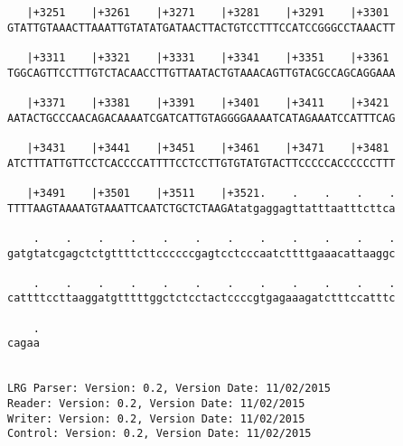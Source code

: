 \documentclass{article}
\begin{document}
\begin{Verbatim}
   |+3251    |+3261    |+3271    |+3281    |+3291    |+3301 
GTATTGTAAACTTAAATTGTATATGATAACTTACTGTCCTTTCCATCCGGGCCTAAACTT
                                                            
   |+3311    |+3321    |+3331    |+3341    |+3351    |+3361 
TGGCAGTTCCTTTGTCTACAACCTTGTTAATACTGTAAACAGTTGTACGCCAGCAGGAAA
                                                            
   |+3371    |+3381    |+3391    |+3401    |+3411    |+3421 
AATACTGCCCAACAGACAAAATCGATCATTGTAGGGGAAAATCATAGAAATCCATTTCAG
                                                            
   |+3431    |+3441    |+3451    |+3461    |+3471    |+3481 
ATCTTTATTGTTCCTCACCCCATTTTCCTCCTTGTGTATGTACTTCCCCCACCCCCCTTT
                                                            
   |+3491    |+3501    |+3511    |+3521.    .    .    .    .
TTTTAAGTAAAATGTAAATTCAATCTGCTCTAAGAtatgaggagttatttaatttcttca
                                                            
    .    .    .    .    .    .    .    .    .    .    .    .
gatgtatcgagctctgttttcttccccccgagtcctcccaatcttttgaaacattaaggc
                                                            
    .    .    .    .    .    .    .    .    .    .    .    .
cattttccttaaggatgtttttggctctcctactccccgtgagaaagatctttccatttc
                                                            
    .
cagaa
     
     
LRG Parser: Version: 0.2, Version Date: 11/02/2015
Reader: Version: 0.2, Version Date: 11/02/2015
Writer: Version: 0.2, Version Date: 11/02/2015
Control: Version: 0.2, Version Date: 11/02/2015
\end{Verbatim}
\end{document}
